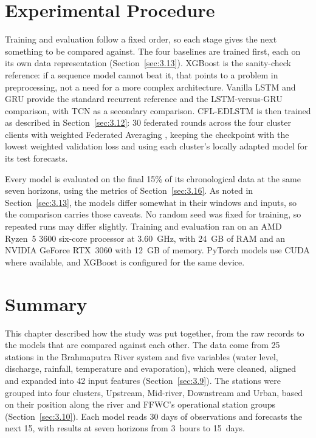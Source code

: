 \section{Experimental Procedure}
\label{sec:3.19}

Training and evaluation follow a fixed order, so each stage gives the next
something to be compared against. The four baselines are trained first, each on
its own data representation (Section~\ref{sec:3.13}). XGBoost is the
sanity-check reference: if a sequence model cannot beat it, that points to a
problem in preprocessing, not a need for a more complex architecture. Vanilla
LSTM and GRU provide the standard recurrent reference and the LSTM-versus-GRU
comparison, with TCN as a secondary comparison. CFL-EDLSTM is then trained as
described in Section~\ref{sec:3.12}: 30 federated rounds across the four cluster
clients with weighted Federated Averaging \cite{McMahan2017}, keeping the
checkpoint with the lowest weighted validation loss and using each cluster's
locally adapted model for its test forecasts.

Every model is evaluated on the final 15\% of its chronological data at the same
seven horizons, using the metrics of Section~\ref{sec:3.16}. As noted in
Section~\ref{sec:3.13}, the models differ somewhat in their windows and inputs,
so the comparison carries those caveats. No random seed was fixed for training,
so repeated runs may differ slightly. Training and evaluation ran on an AMD
Ryzen~5 3600 six-core processor at 3.60~GHz, with 24~GB of RAM and an NVIDIA
GeForce RTX~3060 with 12~GB of memory. PyTorch models use CUDA where available,
and XGBoost is configured for the same device.

\section{Summary}
\label{sec:3.20}

This chapter described how the study was put together, from the raw records to
the models that are compared against each other. The data come from 25 stations
in the Brahmaputra River system and five variables (water level, discharge,
rainfall, temperature and evaporation), which were cleaned, aligned and expanded
into 42 input features (Section~\ref{sec:3.9}). The stations were grouped into
four clusters, Upstream, Mid-river, Downstream and Urban, based on their
position along the river and FFWC's operational station groups
(Section~\ref{sec:3.10}). Each model reads 30 days of observations and forecasts
the next 15, with results at seven horizons from 3~hours to 15~days.

